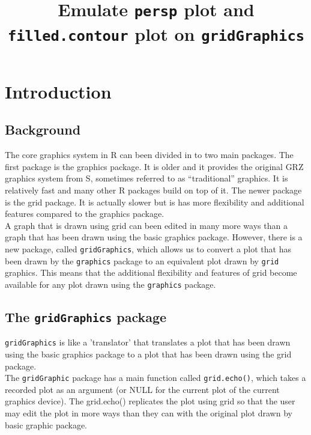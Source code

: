 \documentclass[paper=a4, fontsize=11pt]{report}
\begin{document}

\setlength{\parindent}{0}
\noindent

\title{Emulate \texttt{persp} plot and \texttt{filled.contour} plot on \texttt{gridGraphics}}
\maketitle
\chapter{Introduction}
\section{Background}
The core graphics system in R can been divided in to two main packages. The first package is the graphics package. It is older and it provides the original GRZ graphics system from S, sometimes referred to as ``traditional'' graphics. It is relatively fast and many other R packages build on top of it. The newer package is the grid package. It is actually slower but is has more flexibility and additional features compared to the graphics package. \\

A graph that is drawn using grid can been edited in many more ways than a graph that has been drawn using the basic graphics package. However, there is a new package, called \texttt{gridGraphics}, which allows us to convert a plot that has been drawn by the \texttt{graphics} package to an equivalent plot drawn by \texttt{grid} graphics. This means that the additional flexibility and features of grid become available for any plot drawn using the \texttt{graphics} package. \\

\section{The \texttt{gridGraphics} package}
\texttt{gridGraphics} is like a 'translator' that translates a plot that has been drawn using the basic graphics package to a plot that has been drawn using the grid package. \\

The \texttt{gridGraphic} package has a main function called \texttt{grid.echo()}, which takes a recorded plot as an argument (or NULL for the current plot of the current graphics device). The grid.echo() replicates the plot using grid so that the user may edit the plot in more ways than they can with the original plot drawn by basic graphic package.\\
\end{document}
